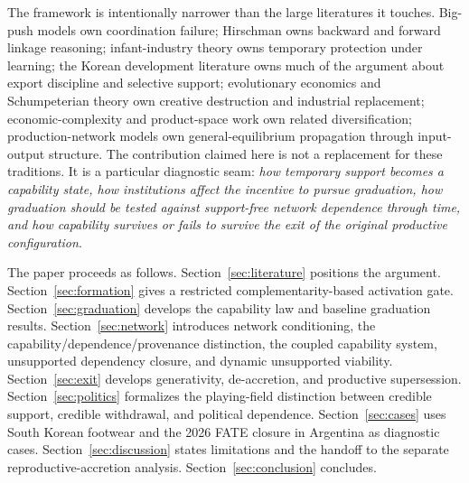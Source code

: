 The framework is intentionally narrower than the large literatures it touches. Big-push models own coordination failure; Hirschman owns backward and forward linkage reasoning; infant-industry theory owns temporary protection under learning; the Korean development literature owns much of the argument about export discipline and selective support; evolutionary economics and Schumpeterian theory own creative destruction and industrial replacement; economic-complexity and product-space work own related diversification; production-network models own general-equilibrium propagation through input-output structure. The contribution claimed here is not a replacement for these traditions. It is a particular diagnostic seam: \emph{how temporary support becomes a capability state, how institutions affect the incentive to pursue graduation, how graduation should be tested against support-free network dependence through time, and how capability survives or fails to survive the exit of the original productive configuration}.

The paper proceeds as follows. Section~\ref{sec:literature} positions the argument. Section~\ref{sec:formation} gives a restricted complementarity-based activation gate. Section~\ref{sec:graduation} develops the capability law and baseline graduation results. Section~\ref{sec:network} introduces network conditioning, the capability/dependence/provenance distinction, the coupled capability system, unsupported dependency closure, and dynamic unsupported viability. Section~\ref{sec:exit} develops generativity, de-accretion, and productive supersession. Section~\ref{sec:politics} formalizes the playing-field distinction between credible support, credible withdrawal, and political dependence. Section~\ref{sec:cases} uses South Korean footwear and the 2026 FATE closure in Argentina as diagnostic cases. Section~\ref{sec:discussion} states limitations and the handoff to the separate reproductive-accretion analysis. Section~\ref{sec:conclusion} concludes.
